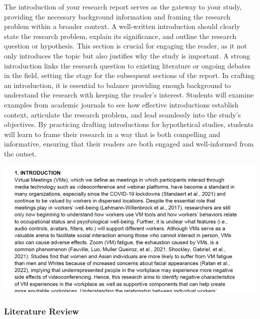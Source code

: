 \documentclass[
]{book}
\begin{document}
The introduction of your research report serves as the gateway to your study, providing the necessary background information and framing the research problem within a broader context. A well-written introduction should clearly state the research problem, explain its significance, and outline the research question or hypothesis. This section is crucial for engaging the reader, as it not only introduces the topic but also justifies why the study is important. A strong introduction links the research question to existing literature or ongoing debates in the field, setting the stage for the subsequent sections of the report. In crafting an introduction, it is essential to balance providing enough background to understand the research with keeping the reader's interest. Students will examine examples from academic journals to see how effective introductions establish context, articulate the research problem, and lead seamlessly into the study's objectives. By practicing drafting introductions for hypothetical studies, students will learn to frame their research in a way that is both compelling and informative, ensuring that their readers are both engaged and well-informed from the outset.

\includegraphics[width=1\linewidth,height=\textheight,keepaspectratio]{images/fig082.jpg}

\subsubsection*{Literature Review}\label{literature-review}
\end{document}
